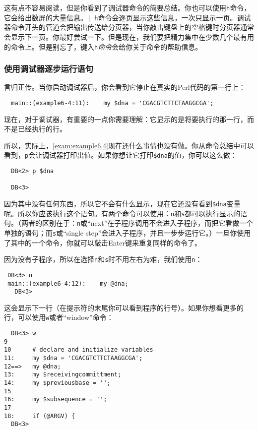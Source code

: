这有点不容易阅读，但是你看到了调试器命令的简要总结。你也可以使用\verb|h|命令，它会给出数屏的大量信息。\verb=| h=命令会逐页显示这些信息，一次只显示一页。调试器命令开头的管道会把输出传送给分页器，当你敲击键盘上的空格键时分页器通常会显示下一页。你最好尝试一下。但是现在，我们要把精力集中在少数几个最有用的命令上。但是别忘了，键入\verb|h|\textit{命令}会给你关于命令的帮助信息。

\subsubsection{使用调试器逐步运行语句}
言归正传。当你启动调试器后，你会看到它停止在真实的Perl代码的第一行上：

\begin{lstlisting}
  main::(example6-4:11):    my $dna = 'CGACGTCTTCTAAGGCGA';
\end{lstlisting}

现在，对于调试器，有重要的一点你需要理解：它显示的是将要执行的那一行，而不是已经执行的行。

所以，实际上，\autoref{exam:example6.4}现在还什么事情也没有做。你从命令总结中可以看到，\verb|p|会让调试器打印出值。如果你想让它打印\verb|$dna|的值，你可以这么做：

\begin{lstlisting}
  DB<2> p $dna

  DB<3> 
\end{lstlisting}

因为其中没有任何东西，所以它不会有什么显示，现在它还没有看到\verb|$dna|变量呢。所以你应该执行这个语句。有两个命令可以使用：\verb|n|和\verb|s|都可以执行显示的语句。（两者的区别在于：\verb|n|或“next”在子程序调用不会进入子程序，而把它看做一个单独的语句；而\verb|s|或“single step”会进入子程序，并且一步步运行它。）一旦你使用了其中的一个命令，你就可以敲击Enter键来重复同样的命令了。

因为没有子程序，所以在选择\verb|n|和\verb|s|时不用左右为难，我们使用\verb|n|：

\begin{lstlisting}
 DB<3> n
 main::(example6-4:12):    my @dna;
   DB<3> 
\end{lstlisting}

这会显示下一行（在提示符的末尾你可以看到程序的行号）。如果你想看更多的行，可以使用\verb|w|或者“window”命令：

\begin{lstlisting}
  DB<3> w
9
10      # declare and initialize variables
11:     my $dna = 'CGACGTCTTCTAAGGCGA';
12==>   my @dna;
13:     my $receivingcommittment;
14:     my $previousbase = ''; 
15
16:     my $subsequence = '';
17
18:     if (@ARGV) {
  DB<3>
\end{lstlisting}

